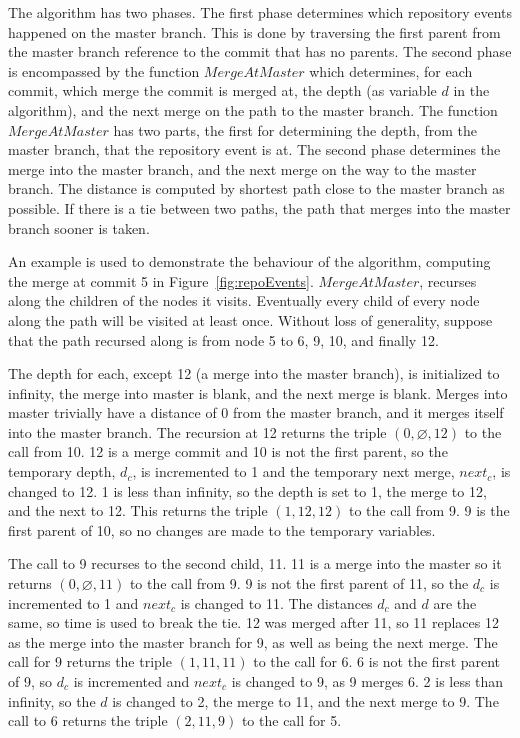 The algorithm has two phases.
The first phase determines which repository events happened on the master
branch.
This is done by traversing the first parent from the master branch
reference to the commit that has no parents.
The second phase is encompassed by the function
$MergeAtMaster$ which determines, for each commit, which merge the
commit is merged at, the depth (as variable $d$ in the algorithm), and
the next merge on the path to the master branch.
The function $MergeAtMaster$ has two parts,
the first for determining the depth,
from the master branch,
that the repository event is at.
The second phase determines the merge into the master branch,
and the next merge on the way to the master branch.
The distance is computed by shortest path close to the master branch as
possible.
If there is a tie between two paths, the path that merges into the
master branch sooner is taken.

An example is used to demonstrate the behaviour of the algorithm,
computing the merge at commit 5 in Figure~\ref{fig:repoEvents}.
$MergeAtMaster$, recurses along the children of the nodes it visits.
Eventually every child of every node along the path will be visited at
least once. Without loss of generality, suppose that the path recursed
along is from node 5 to 6, 9, 10, and finally 12.

The depth for each, except 12 (a merge into the master branch), is
initialized to infinity, the merge into master is blank, and the next
merge is blank. Merges into master trivially have a distance of 0 from
the master branch, and it merges itself into the master branch. The
recursion at 12 returns the triple $(0, \varnothing, 12)$ to the call
from 10. 12 is a merge commit and 10 is not the first parent, so the
temporary depth, $d_c$, is incremented to 1 and the temporary next
merge, $next_c$, is changed to 12. 1 is less than infinity, so the depth
is set to 1, the merge to 12, and the next to 12. This returns the
triple $(1, 12, 12)$ to the call from 9. 9 is the first parent of 10, so
no changes are made to the temporary variables.

The call to 9 recurses to the second child, 11. 11 is a merge into the
master so it returns $(0, \varnothing, 11)$ to the call from 9. 9 is not
the first parent of 11, so the $d_c$ is incremented to 1 and $next_c$ is
changed to 11. The distances $d_c$ and $d$ are the same, so time is used
to break the tie. 12 was merged after 11, so 11 replaces 12 as the
merge into the master branch for 9, as well as being the next merge. The
call for 9 returns the triple $(1, 11, 11)$ to the call for 6. 6 is not
the first parent of 9, so $d_c$ is incremented and $next_c$ is changed
to 9, as 9 merges 6. 2 is less than infinity, so the $d$ is changed to
2, the merge to 11, and the next merge to 9. The call to 6 returns the
triple $(2, 11, 9)$ to the call for 5.

